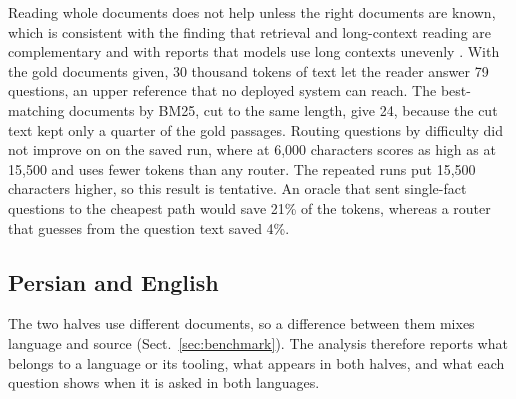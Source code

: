 Reading whole documents does not help unless the right documents are known, which is consistent with the finding that retrieval and long-context reading are complementary \citep{li2024selfroute,xu2024retrieval} and with reports that models use long contexts unevenly \citep{liu2024lost}. With the gold documents given, 30 thousand tokens of text let the reader answer 79 questions, an upper reference that no deployed system can reach. The best-matching documents by BM25, cut to the same length, give 24, because the cut text kept only a quarter of the gold passages. Routing questions by difficulty did not improve on \hr{} on the saved run, where \hr{} at 6,000 characters scores as high as at 15,500 and uses fewer tokens than any router. The repeated runs put 15,500 characters higher, so this result is tentative. An oracle that sent single-fact questions to the cheapest path would save 21\% of the tokens, whereas a router that guesses from the question text saved 4\%.

\subsection{Persian and English}
\label{sec:language}
The two halves use different documents, so a difference between them mixes language and source (Sect.~\ref{sec:benchmark}). The analysis therefore reports what belongs to a language or its tooling, what appears in both halves, and what each question shows when it is asked in both languages.

